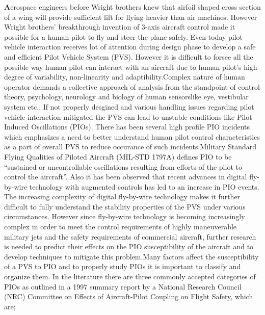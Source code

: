 \par \lettrine[lraise=0.3,loversize=1]{\textbf{A}}{}erospace engineers before Wright brothers knew that airfoil shaped cross section of a wing will provide sufficient lift for flying heavier than air machines. However Wright brothers' breakthrough invention of 3-axis aircraft control made it possible for a human pilot to fly and steer the plane safely\cite{birthofflightcontrol}. Even today pilot vehicle interaction receives lot of attention during design phase to develop a safe and efficient Pilot Vehicle System (PVS). However it is difficult to forsee all the possible way human pilot can interact with an aircraft due to human pilot's high degree of variability, non-linearity and adaptibility.Complex nature of human operator demands a collective approach of analysis from the standpoint of control theory, psychology, neurology and biology of human sensorslike eye, vestibular system etc.\cite{mcruer1965human}\cite{mcruer1969theory}\cite{hosman1999pilot}. If not properly desgined and various handling issues regarding pilot vehicle interaction mitigated the PVS can lead to unstable conditions like Pilot Induced Oscillations (PIOs)\cite{McRuerPIO}. There has been several high profile PIO incidents\cite{SAABPIO}\cite{YF22} which emphasizes a need to better understand human pilot control characteristics as a part of overall PVS to reduce occurance of such incidents.Military Standard Flying Qualities of Piloted Aircraft (MIL-STD 1797A)\cite{MLSTD} defines PIO to be “sustained or uncontrollable oscillations resulting from efforts of the pilot to control the aircraft”. Also it has been observed that recent advances in digital fly-by-wire technology with augmented controls has led to an increase in PIO events\cite{BoeingPIO}\cite{Norton}\cite{hoh1982bandwidth}\cite{hess1991technique}\cite{green1986design}. The increasing complexity of digital fly-by-wire technology makes it  further difficult to fully understand the stability properties of the PVS under various circumstances. However since fly-by-wire technology is becoming increasingly complex in order to meet the control requirements of highly maneuverable military jets and the safety requirements of commercial aircraft, further research is needed to predict their effects on the PIO susceptibility of the aircraft and to develop techniques to mitigate this problem.Many factors affect the susceptibility of a PVS to PIO and to properly study PIOs it is important to classify and organize them. In the literature there are three commonly accepted categories of PIOs as outlined in a 1997 summary report by a National Research Council (NRC) Committee on Effects of Aircraft-Pilot Coupling on Flight Safety\cite{mcruer1997aviation}, which are;\\
